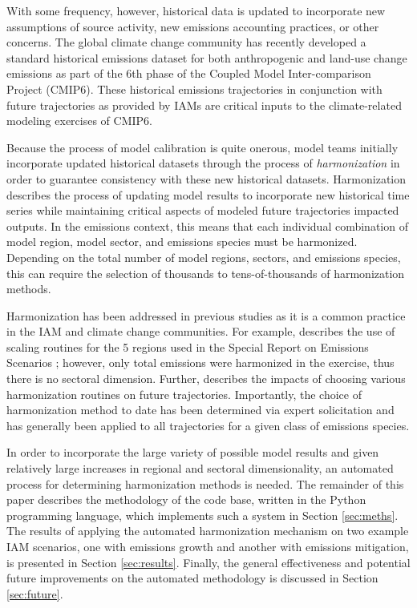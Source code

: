 With some frequency, however, historical data is updated to incorporate new
assumptions of source activity, new emissions accounting practices, or other
concerns. The global climate change community has recently developed a standard
historical emissions dataset for both anthropogenic
\cite{hoesly_historical_2017} and land-use change emissions
\cite{van_marle_historic_2017} as part of the 6th phase of the Coupled Model
Inter-comparison Project (CMIP6). These historical emissions trajectories in
conjunction with future trajectories as provided by IAMs are critical inputs to
the climate-related modeling exercises of CMIP6.

Because the process of model calibration is quite onerous, model teams initially
incorporate updated historical datasets through the process of
\textit{harmonization} in order to guarantee consistency with these new
historical datasets. Harmonization describes the process of updating model
results to incorporate new historical time series while maintaining critical
aspects of modeled future trajectories impacted outputs. In the emissions
context, this means that each individual combination of model region, model
sector, and emissions species must be harmonized. Depending on the total number
of model regions, sectors, and emissions species, this can require the selection
of thousands to tens-of-thousands of harmonization methods.

Harmonization has been addressed in previous studies as it is a common practice
in the IAM and climate change communities. For example,
\cite{meinshausen_rcp_2011} describes the use of scaling routines for the 5
regions used in the Special Report on Emissions Scenarios ; however,
only total emissions were harmonized in the exercise, thus there is no sectoral
dimension. Further, \cite{rogelj_discrepancies_2011} describes the impacts of
choosing various harmonization routines on future trajectories. Importantly, the
choice of harmonization method to date has been determined via expert
solicitation and has generally been applied to all trajectories for a given
class of emissions species.

In order to incorporate the large variety of possible model results and given
relatively large increases in regional and sectoral dimensionality, an automated
process for determining harmonization methods is needed. The remainder of this
paper describes the methodology of the  code base, written in the
Python programming language, which implements such a system in Section
\ref{sec:meths}. The results of applying the automated harmonization mechanism
on two example IAM scenarios, one with emissions growth and another with
emissions mitigation, is presented in Section \ref{sec:results}. Finally, the
general effectiveness and potential future improvements on the automated
methodology is discussed in Section \ref{sec:future}.

